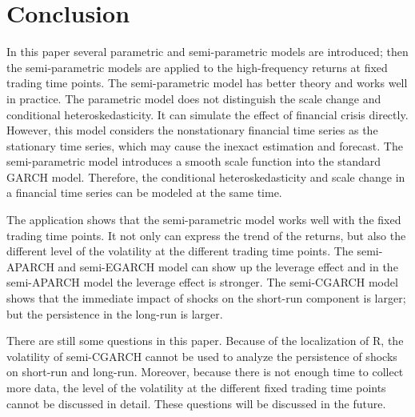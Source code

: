\chapter{Conclusion}

In this paper several parametric and semi-parametric models are introduced; then the semi-parametric models are applied to the high-frequency returns at fixed trading time points. The semi-parametric model has better theory and works well in practice. The parametric model does not distinguish the scale change and conditional heteroskedasticity. It can simulate the effect of financial crisis directly. However, this model considers the nonstationary financial time series as the stationary time series, which may cause the inexact estimation and forecast. The semi-parametric model introduces a smooth scale function into the standard GARCH model. Therefore, the conditional heteroskedasticity and scale change in a financial time series can be modeled at the same time.

The application shows that the semi-parametric model works well with the fixed trading time points. It not only can express the trend of the returns, but also the different level of the volatility at the different trading time points. The semi-APARCH and semi-EGARCH model can show up the leverage effect and in the semi-APARCH model the leverage effect is stronger. The semi-CGARCH model shows that the immediate impact of shocks on the short-run component is larger; but the persistence in the long-run is larger.

There are still some questions in this paper. Because of the localization of R, the volatility of semi-CGARCH cannot be used to analyze the persistence of shocks on short-run and long-run. Moreover, because there is not enough time to collect more data, the level of the volatility at the different fixed trading time points cannot be discussed in detail. These questions will be discussed in the future.
